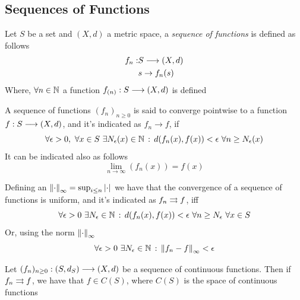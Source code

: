 \documentclass[../complete.tex]{subfiles}
\begin{document}
\subsection{Sequences of Functions}
\begin{dfn}
	Let $S$ be a set and $(X,d)$ a metric space, a \textit{sequence of functions} is defined as follows
	\begin{equation}
		\begin{aligned}
			f_n:&S\overset{}{\longrightarrow}(X,d)\\
			&s\to f_n(s)
		\end{aligned}
		\label{eq:seqfunc}
	\end{equation}
	Where, $\forall n\in\mathbb{N}$ a function $f_{(n)}:S\overset{}{\longrightarrow}(X,d)$ is defined
\end{dfn}
\begin{dfn}
	A sequence of functions $(f_n)_{n\ge0}$ is said to converge pointwise to a function $f:S\overset{}{\longrightarrow}(X,d)$, and it's indicated as $f_n\to f$, if
	\begin{equation}
		\forall\epsilon>0,\ \forall x\in S\ \exists N_\epsilon(x)\in\N\st d(f_n(x),f(x))<\epsilon\ \forall n\ge N_\epsilon(x)
		\label{eq:pointwiseconv}
	\end{equation}
	It can be indicated also as follows
	\begin{equation}
		\lim_{n\to\infty}(f_n(x))=f(x)
		\label{eq:pointwiseconv2}
	\end{equation}
\end{dfn}
\begin{dfn}
	Defining an $\norm{\cdot}_\infty=\sup_{i\le n}\abs{\cdot}$ we have that the convergence of a sequence of functions is uniform, and it's indicated as $f_n\rightrightarrows f$, iff
	\begin{equation}
		\forall\epsilon>0\ \exists N_\epsilon\in\mathbb{N}\, :\,  d(f_n(x),f(x))<\epsilon\ \forall n\ge N_\epsilon\ \forall x\in S
		\label{eq:uniformconv}
	\end{equation}
	Or, using the norm $\norm{\cdot}_{\infty}$
	\begin{equation}
		\forall\epsilon>0\ \exists N_\epsilon\in\mathbb{N}\, :\, \norm{f_n-f}_{\infty}<\epsilon
		\label{eq:uniformconv2}
	\end{equation}
\end{dfn}
\begin{thm}
	Let $(f_n)_{n\ge0}:(S,d_S)\overset{}{\longrightarrow}(X,d)$ be a sequence of continuous functions. Then if $f_n\rightrightarrows f$, we have that $f\in C(S)$, where $C(S)$ is the space of continuous functions
\end{thm}
\end{document}
